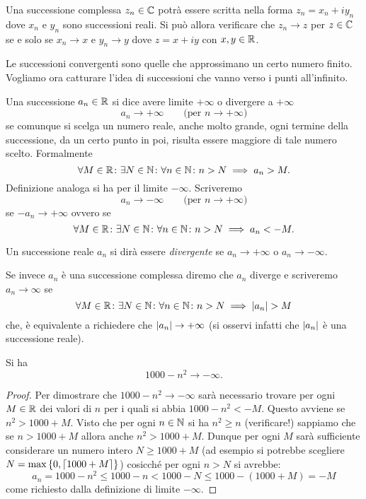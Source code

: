 \begin{exercise}
Una successione complessa $z_n\in \mathbb C$ potrà essere scritta
nella forma $z_n = x_n + i y_n$ dove $x_n$ e $y_n$ sono successioni
reali. Si può allora verificare che $z_n\to z$ per $z\in \mathbb C$ se e solo se
$x_n\to x$ e $y_n\to y$ dove $z=x+ iy$ con $x,y\in \mathbb R$.
\end{exercise}

Le successioni convergenti sono quelle che approssimano un
certo numero finito.
Vogliamo ora catturare l'idea di successioni che vanno verso i
punti all'infinito.

\begin{definition}
\mymark{***}
Una successione $a_n\in \mathbb R$ si dice avere limite $+\infty$
o divergere a $+\infty$
\[
  a_n \to +\infty \qquad\text{(per $n\to +\infty$)}
\]
se comunque si scelga un numero reale, anche molto grande,
ogni termine della successione, da un certo punto in poi,
risulta essere maggiore di tale numero scelto. Formalmente
\begin{equation}\label{eq:limite_infinito_successione}
  \forall M\in \mathbb R\colon \exists N\in \mathbb N \colon \forall n\in \mathbb N\colon
  n>N \implies a_n >M.
\end{equation}
Definizione analoga si ha per il limite $-\infty$. Scriveremo
\[
  a_n \to -\infty \qquad \text{(per $n\to +\infty$)}
\]
se $-a_n\to +\infty$ ovvero se
\begin{equation}\label{eq:limite_meno_infinito_successione}
  \forall M\in \mathbb R\colon \exists N\in \mathbb N \colon \forall n\in \mathbb N\colon
  n>N\implies a_n < -M.
\end{equation}

Un successione reale $a_n$ si dirà essere \emph{divergente}
se $a_n\to +\infty$ o $a_n\to -\infty$.

Se invece $a_n$ è una successione complessa diremo che $a_n$ diverge e scriveremo
$a_n \to \infty$
se
\[
  \forall M\in \mathbb R\colon \exists N \in \mathbb N \colon \forall n\in \mathbb N \colon
  n>N \implies {\left|a_n\right|} > M
\]
che, è equivalente a richiedere che ${\left|a_n\right|}\to +\infty$
(si osservi infatti che ${\left|a_n\right|}$ è una successione reale).
\end{definition}

\begin{example}
Si ha
\[
  1000-n^2 \to -\infty.
\]
\end{example}
%
\begin{proof}
Per dimostrare che $1000-n^2\to -\infty$ sarà
necessario trovare per ogni $M\in \mathbb R$
dei valori di $n$ per i quali si abbia $1000-n^2 < -M$.
Questo avviene se $n^2 > 1000 + M$. Visto che per ogni $n\in \mathbb N$
si ha $n^2 \ge n$ (verificare!) sappiamo che se $n> 1000+M$ allora
anche $n^2 > 1000+M$. Dunque per ogni $M$ sarà sufficiente considerare
un numero intero $N \ge 1000 + M$
(ad esempio si potrebbe scegliere $N = \max{\left\{ 0, \lceil 1000 + M\rceil \right\}}$)
cosicché per ogni $n>N$ si avrebbe:
\[
 a_n = 1000 - n^2 \le 1000 - n < 1000 - N \le 1000 - (1000  + M) = -M
\]
come richiesto dalla definizione di limite $-\infty$.
\end{proof}

